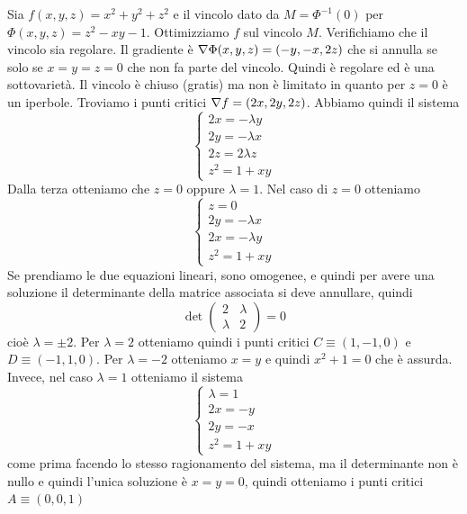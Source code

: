 \documentclass[a4paper]{article}
\begin{document}
\begin{snippetexercise}{}
    Sia \(f(x,y,z) = x^2 + y^2 + z^2\) e il vincolo dato da
    \(M = \Phi^{-1}(0)\) per \(\Phi(x,y,z) = z^2 - xy - 1\). Ottimizziamo \(f\) sul vincolo \(M\).
    Verifichiamo che il vincolo sia regolare. Il gradiente è
    \(\nabla \Phi(x,y,z) = (-y, -x, 2z)\) che si annulla se solo se \(x=y=z=0\)
    che non fa parte del vincolo. Quindi è regolare ed è una sottovarietà.
    Il vincolo è chiuso (gratis) ma non è limitato in quanto per \(z=0\) è un iperbole.
    Troviamo i punti critici \(\nabla f = (2x, 2y, 2z)\). Abbiamo quindi il sistema
    \[
        \begin{cases}
            2x = -\lambda y \\
            2y = -\lambda x \\
            2z = 2\lambda z \\
            z^2 = 1 + xy
        \end{cases}
    \]
    Dalla terza otteniamo che \(z=0\) oppure \(\lambda = 1\).
    Nel caso di \(z=0\) otteniamo
    \[
        \begin{cases}
            z = 0 \\
            2y = -\lambda x \\
            2x = -\lambda y \\
            z^2 = 1 + xy
        \end{cases}
    \]
    Se prendiamo le due equazioni lineari, sono omogenee, e quindi per avere una soluzione
    il determinante della matrice associata si deve annullare, quindi
    \[
        \det \begin{pmatrix}
            2 & \lambda \\ \lambda & 2
        \end{pmatrix} = 0
    \]
    cioè \(\lambda = \pm 2\).
    Per \(\lambda = 2\) otteniamo quindi i
    punti critici \(C \equiv (1, -1, 0)\) e \(D \equiv (-1, 1, 0)\).
    Per \(\lambda = - 2\) otteniamo \(x=y\) e quindi \(x^2+ 1 = 0\) che è assurda.
    Invece, nel caso \(\lambda = 1\) otteniamo il sistema
    \[
        \begin{cases}
            \lambda = 1 \\
            2x = -y \\
            2y = -x \\
            z^2 = 1 + xy
        \end{cases}
    \]
    come prima facendo lo stesso ragionamento del sistema, ma il determinante non è nullo e quindi l'unica soluzione è
    \(x=y=0\), quindi otteniamo i punti critici \(A \equiv (0,0,1)\)

\end{snippetexercise}
\end{document}
